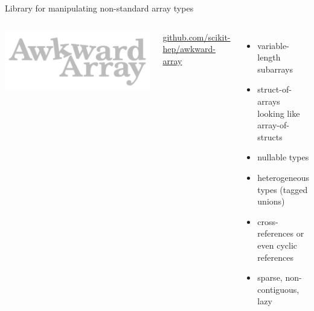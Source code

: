\documentclass[aspectratio=169]{beamer}
\begin{document}
\begin{frame}{Library for manipulating non-standard array types}
\vspace{0.5 cm}
\begin{columns}
\includegraphics[width=\linewidth]{awkward-logo.pdf}

\vspace{0.25 cm}
\hfill \scriptsize \textcolor{darkblue}{\url{github.com/scikit-hep/awkward-array}}

\vspace{0.5 cm}
\vspace{2\baselineskip}
\begin{itemize}
\item variable-length subarrays
\item struct-of-arrays looking like array-of-structs
\item nullable types
\item heterogeneous types (tagged unions)
\item cross-references or even cyclic references
\item sparse, non-contiguous, lazy
\end{itemize}

\vspace{0.5 cm}
\end{columns}
\end{frame}
\end{document}
